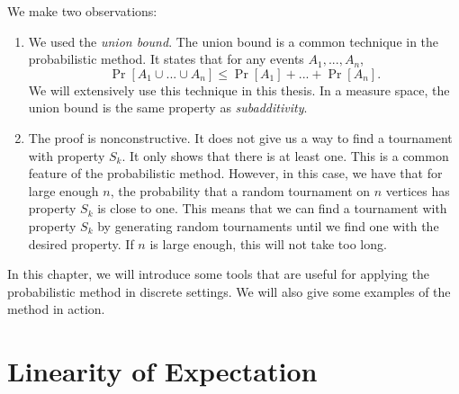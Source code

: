 We make two observations: 
\begin{enumerate}
    \item We used the \textit{union bound}. The union bound is a common technique in the probabilistic method. It states that for any events $A_1, ..., A_n$,
    \[\Pr[A_1 \cup ... \cup A_n] \leq \Pr[A_1] + ... + \Pr[A_n].\]
    We will extensively use this technique in this thesis. In a measure space, the union bound is the same property as \textit{subadditivity}. \par
    \item The proof is nonconstructive. It does not give us a way to find a tournament with property $S_k$. It only shows that there is at least one. This is a common feature of the probabilistic method. However, in this case, we have that for large enough $n$, the probability that a random tournament on $n$ vertices has property $S_k$ is close to one. This means that we can find a tournament with property $S_k$ by generating random tournaments until we find one with the desired property. If $n$ is large enough, this will not take too long. \par
\end{enumerate}
In this chapter, we will introduce some tools that are useful for applying the probabilistic method in discrete settings. We will also give some examples of the method in action. \par

\section{Linearity of Expectation}\label{sec:probmet:linearity}

